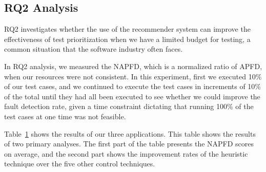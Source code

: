 \begin{table}[!ht]
\begin{center}
{\begin{tabular}{|c|c|c|c|c|c|c||c|c|c|c|c|c|}

\end{tabular}
}
\end {center}
\label{tab:napfd}
\vspace*{-5pt}
\end{table}

\subsection{RQ2 Analysis}

RQ2 investigates whether the use of the recommender system can improve the 
effectiveness of test prioritization when we have a limited budget for testing,
a common situation that the software industry often faces.

In RQ2 analysis, we measured the NAPFD, which is a normalized ratio of APFD, when 
our resources were not consistent.
In this experiment, first we executed 10\% of our test cases, and we continued to execute the
test cases in increments of 10\% of the total until they had all been  
executed to see whether we could improve the fault detection rate, given a 
time constraint dictating that running 100\% of the test cases at one time was not feasible. 

Table~\ref{tab:napfd} shows the results of our three applications.
This table shows the results of two primary analyses. The first part of the table 
presents the NAPFD scores on average, and the second part shows the 
improvement rates of the heuristic technique over the five other control techniques. 

